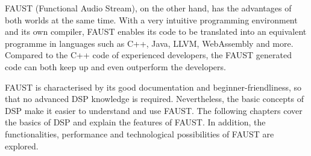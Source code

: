 FAUST (Functional Audio Stream), on the other hand, has the advantages of both worlds at the same time. With a very intuitive programming environment and its own compiler, FAUST enables its code to be translated into an equivalent programme in languages such as C++, Java, LLVM, WebAssembly and more. Compared to the C++ code of experienced developers, the FAUST generated code can both keep up and even outperform the developers.  

FAUST is characterised by its good documentation and beginner-friendliness, so that no advanced DSP knowledge is required. Nevertheless, the basic concepts of DSP make it easier to understand and use FAUST. The following chapters cover the basics of DSP and explain the features of FAUST. In addition, the functionalities, performance and technological possibilities of FAUST are explored.  

